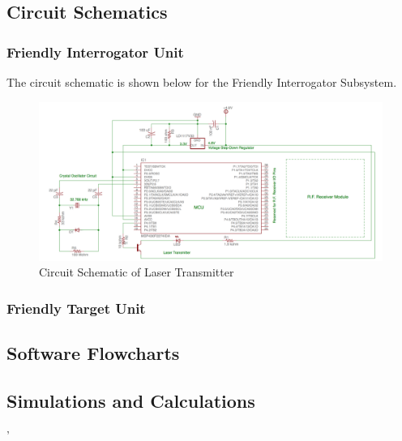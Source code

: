 \documentclass[letterpaper,10pt]{article}
\begin{document}
\begin{spacing}{1.15}
\subsection{Circuit Schematics}

\subsubsection{Friendly Interrogator Unit}
The circuit schematic is shown below for the Friendly Interrogator Subsystem.
\begin{figure} [H]
	\centering
	\includegraphics[scale=0.45]{Circuit_Schematic.png}
	\caption{Circuit Schematic of Laser Transmitter\label{fig:circuit-schematic}}
\end{figure}

\subsubsection{Friendly Target Unit}

\subsection{Software Flowcharts}

\subsection{Simulations and Calculations}'



\end{spacing}
\end{document}
